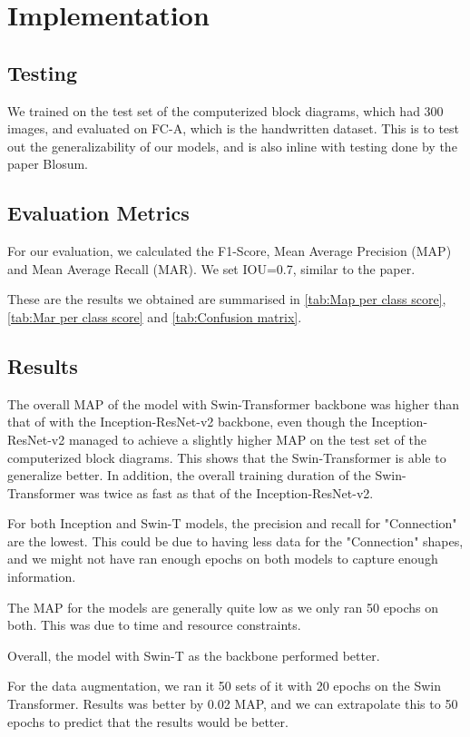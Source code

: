 \section{Implementation}
\subsection{Testing}
We trained on the test set of the computerized block diagrams, which had 300 images, and evaluated on FC-A, which is the handwritten dataset. This is to test out the generalizability of our models, and is also inline with testing done by the paper Blosum. 

\subsection{Evaluation Metrics}
For our evaluation, we calculated the F1-Score, Mean Average Precision (MAP) and Mean Average Recall (MAR). We set IOU=0.7, similar to the paper. 

These are the results we obtained are summarised in \cref{tab:Map per class score}, \cref{tab:Mar per class score} and \cref{tab:Confusion matrix}.




\subsection{Results}
The overall MAP of the model with Swin-Transformer backbone was higher than that of with the Inception-ResNet-v2 backbone, even though the Inception-ResNet-v2 managed to achieve a slightly higher MAP on the test set of the computerized block diagrams. This shows that the Swin-Transformer is able to generalize better. In addition, the overall training duration of the Swin-Transformer was twice as fast as that of the Inception-ResNet-v2. 

For both Inception and Swin-T models, the precision and recall for "Connection" are the lowest. This could be due to having less data for the "Connection" shapes, and we might not have ran enough epochs on both models to capture enough information. 

The MAP for the models are generally quite low as we only ran 50 epochs on both. This was due to time and resource constraints. 

Overall, the model with Swin-T as the backbone performed better.

For the data augmentation, we ran it 50 sets of it with 20 epochs on the Swin Transformer. Results was better by 0.02 MAP, and we can extrapolate this to 50 epochs to predict that the results would be better. 

